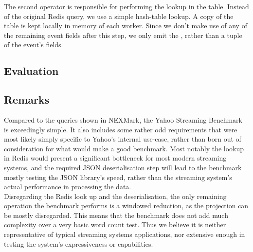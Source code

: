 The second  operator is responsible for performing the lookup in the  table. Instead of the original Redis query, we use a simple hash-table lookup. A copy of the table is kept locally in memory of each worker. Since we don't make use of any of the remaining event fields after this step, we only emit the , rather than a tuple of the event's fields.

\subsection{Evaluation}



\subsection{Remarks}
Compared to the queries shown in NEXMark, the Yahoo Streaming Benchmark is exceedingly simple. It also includes some rather odd requirements that were most likely simply specific to Yahoo's internal use-case, rather than born out of consideration for what would make a good benchmark. Most notably the lookup in Redis would present a significant bottleneck for most modern streaming systems, and the required JSON deserialisation step will lead to the benchmark mostly testing the JSON library's speed, rather than the streaming system's actual performance in processing the data. \\

Disregarding the Redis look up and the deserialisation, the only remaining operation the benchmark performs is a windowed reduction, as the projection can be mostly disregarded. This means that the benchmark does not add much complexity over a very basic word count test. Thus we believe it is neither representative of typical streaming systems applications, nor extensive enough in testing the system's expressiveness or capabilities.

